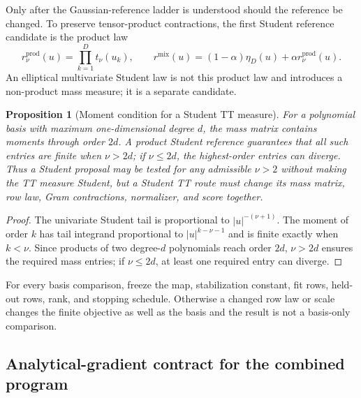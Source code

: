 \documentclass[11pt]{article}
\newtheorem{proposition}{Proposition}
\begin{document}
Only after the Gaussian-reference ladder is understood should the reference be
changed. To preserve tensor-product contractions, the first Student reference
candidate is the product law
\begin{equation}\label{eq:coherent-product-student-reference}
 r_{\nu}^{\mathrm{prod}}(u)=\prod_{k=1}^D t_\nu(u_k),
 \qquad
 r^{\mathrm{mix}}(u)=(1-\alpha)\eta_D(u)+\alpha r_{\nu}^{\mathrm{prod}}(u).
\end{equation}
An elliptical multivariate Student law is not this product law and introduces a
non-product mass measure; it is a separate candidate.

\begin{proposition}[Moment condition for a Student TT measure]
\label{prop:coherent-student-measure}
For a polynomial basis with maximum one-dimensional degree $d$, the mass
matrix contains moments through order $2d$. A product Student reference
guarantees that all such entries are finite when $\nu>2d$; if $\nu\leq2d$,
the highest-order entries can diverge. Thus a Student proposal may be tested for any admissible
$\nu>2$ without making the TT measure Student, but a Student TT route must
change its mass matrix, row law, Gram contractions, normalizer, and score
together.
\end{proposition}

\begin{proof}
The univariate Student tail is proportional to $|u|^{-(\nu+1)}$. The moment
of order $k$ has tail integrand proportional to $|u|^{k-\nu-1}$ and is finite
exactly when $k<\nu$. Since products of two degree-$d$ polynomials reach order
$2d$, $\nu>2d$ ensures the required mass entries; if $\nu\leq2d$, at least
one required entry can diverge.
\end{proof}

For every basis comparison, freeze the map, stabilization constant, fit rows,
held-out rows, rank, and stopping schedule. Otherwise a changed row law or
scale changes the finite objective as well as the basis and the result is not a
basis-only comparison.

\subsection{Analytical-gradient contract for the combined program}
\end{document}
